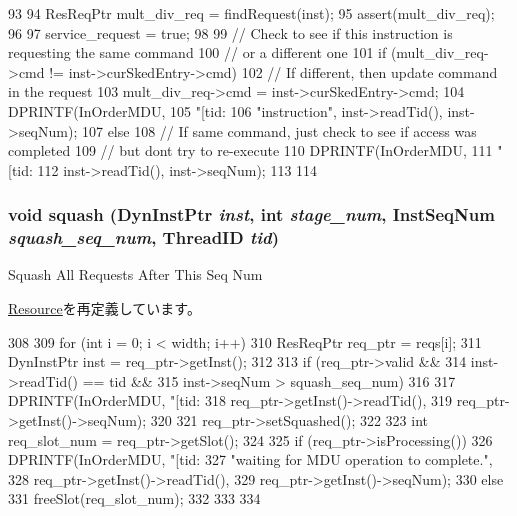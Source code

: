 \begin{DoxyCode}
93 {
94     ResReqPtr mult_div_req = findRequest(inst);
95     assert(mult_div_req);
96 
97     service_request = true;
98 
99     // Check to see if this instruction is requesting the same command
100     // or a different one
101     if (mult_div_req->cmd != inst->curSkedEntry->cmd) {
102         // If different, then update command in the request
103         mult_div_req->cmd = inst->curSkedEntry->cmd;
104         DPRINTF(InOrderMDU,
105                 "[tid:%
106                 "instruction\n", inst->readTid(), inst->seqNum);
107     } else {
108         // If same command, just check to see if access was completed
109         // but dont try to re-execute
110         DPRINTF(InOrderMDU,
111                 "[tid:%
112                 inst->readTid(), inst->seqNum);
113     }
114 }
\end{DoxyCode}
\hypertarget{classMultDivUnit_a52235c5e3d912452f254dc45f1496fd2}{
\subsubsection[{squash}]{\setlength{\rightskip}{0pt plus 5cm}void squash ({\bf DynInstPtr} {\em inst}, \/  int {\em stage\_\-num}, \/  {\bf InstSeqNum} {\em squash\_\-seq\_\-num}, \/  {\bf ThreadID} {\em tid})}}
\label{classMultDivUnit_a52235c5e3d912452f254dc45f1496fd2}
Squash All Requests After This Seq Num 

\hyperlink{classResource_a52235c5e3d912452f254dc45f1496fd2}{Resource}を再定義しています。


\begin{DoxyCode}
308 {
309     for (int i = 0; i < width; i++) {
310         ResReqPtr req_ptr = reqs[i];
311         DynInstPtr inst = req_ptr->getInst();
312 
313         if (req_ptr->valid &&
314             inst->readTid() == tid &&
315             inst->seqNum > squash_seq_num) {
316 
317             DPRINTF(InOrderMDU, "[tid:%
318                     req_ptr->getInst()->readTid(),
319                     req_ptr->getInst()->seqNum);
320 
321             req_ptr->setSquashed();
322 
323             int req_slot_num = req_ptr->getSlot();
324 
325             if (req_ptr->isProcessing())
326                 DPRINTF(InOrderMDU, "[tid:%
327                         "waiting for MDU operation to complete.\n",
328                         req_ptr->getInst()->readTid(),
329                         req_ptr->getInst()->seqNum);
330             else
331                 freeSlot(req_slot_num);
332         }
333     }
334 }
\end{DoxyCode}


